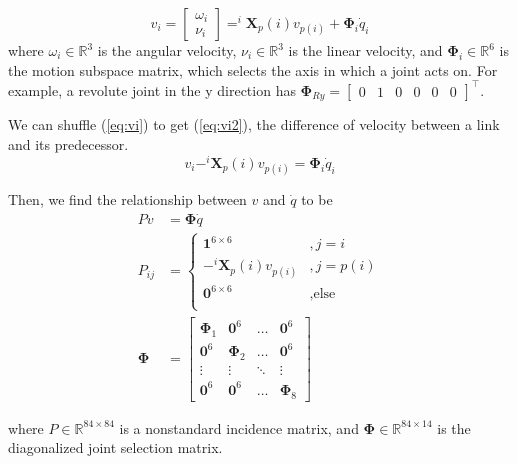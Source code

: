 \documentclass[conference]{IEEEtran}
\begin{document}
\begin{equation}
    v_i = \begin{bmatrix}
        \omega_i \\ \nu_i
    \end{bmatrix} = ^i \mathbf{X}_p(i) v_{p(i)} + \mathbf{\Phi}_i \dot{q}_i
    \label{eq:vi}
\end{equation}
where $\omega_i \in \mathbb{R}^3$ is the angular velocity, $\nu_i \in \mathbb{R}^3$ is the linear velocity, and $\mathbf{\Phi}_i \in \mathbb{R}^6$ is the motion subspace matrix, which selects the axis in which a joint acts on. For example, a revolute joint in the y direction has $\mathbf{\Phi}_{Ry} = \left[ \begin{matrix}
0 & 1 & 0 & 0 & 0 & 0 \end{matrix}\right]^\top$.

We can shuffle (\ref{eq:vi}) to get (\ref{eq:vi2}), the difference of velocity between a link and its predecessor. 
\begin{equation}
    v_i - ^i \mathbf{X}_p(i) v_{p(i)} = \mathbf{\Phi}_i \dot{q}_i
    \label{eq:vi2}
\end{equation}

Then, we find the relationship between $v$ and $\dot{q}$ to be
\begin{align}
    P v &=  \mathbf{\Phi} \dot{q} \\
    P_{ij} &= \begin{cases}
        \mathbf{1}^{6\times 6}&, j = i\\
        - ^i \mathbf{X}_p(i) v_{p(i)}&, j = p(i) \\
        \mathbf{0}^{6\times 6} &, \text{else} \\
    \end{cases} \\
    \mathbf{\Phi} &= \begin{bmatrix}
        \mathbf{\Phi}_1 & \mathbf{0}^{6} & \dots & \mathbf{0}^{6} \\
        \mathbf{0}^{6} & \mathbf{\Phi}_2 & \dots  & \mathbf{0}^{6} \\
        \vdots & \vdots & \ddots & \vdots\\
        \mathbf{0}^{6} &\mathbf{0}^{6} &\dots & \mathbf{\Phi}_8
    \end{bmatrix}
\end{align}

where $P \in \mathbb{R}^{84\times 84}$ is a nonstandard incidence matrix, and $\mathbf{\Phi} \in \mathbb{R}^{84 \times 14}$ is the diagonalized joint selection matrix.
\end{document}
